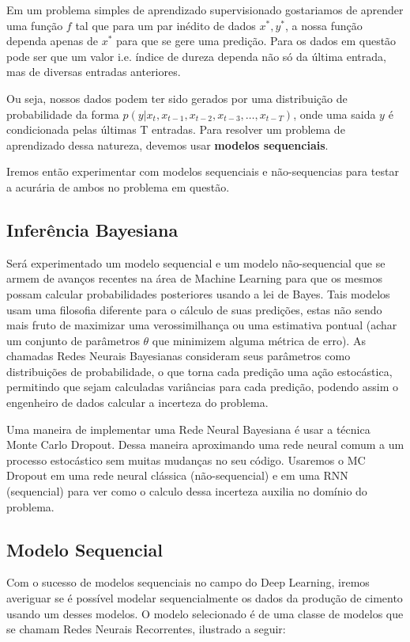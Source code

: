 \documentclass[a4paper]{article}
\begin{document}
Em um problema simples de aprendizado supervisionado gostariamos de aprender uma função $f$ tal que para um par inédito de dados $x^*,y^*$, a nossa função dependa apenas de $x^*$ para que se gere uma predição. Para os dados em questão pode ser que um valor i.e. índice de dureza dependa não só da última entrada, mas de diversas entradas anteriores. 

Ou seja, nossos dados podem ter sido gerados por uma distribuição de probabilidade da forma $p(y | x_{t} ,x_{t -1},x_{t -2},x_{t-3} , \dots, x_{t-T})$, onde uma saida $y$ é condicionada pelas últimas T entradas. Para resolver um problema de aprendizado dessa natureza, devemos usar \textbf{modelos sequenciais}. 

Iremos então experimentar com modelos sequenciais e não-sequencias para testar a acurária de ambos no problema em questão.



\subsection{Inferência Bayesiana}

Será experimentado um modelo sequencial e um modelo não-sequencial que se armem de avanços recentes na área de Machine Learning para que os mesmos possam calcular probabilidades posteriores usando a lei de Bayes. Tais modelos usam uma filosofia diferente para o cálculo de suas predições, estas não sendo mais fruto de maximizar uma verossimilhança ou uma estimativa pontual (achar um conjunto de parâmetros $\theta$ que minimizem alguma métrica de erro). As chamadas Redes Neurais Bayesianas consideram seus parâmetros como distribuições de probabilidade, o que torna cada predição uma ação estocástica, permitindo que sejam calculadas variâncias para cada predição, podendo assim o engenheiro de dados calcular a incerteza do problema.

Uma maneira de implementar uma Rede Neural Bayesiana é usar a técnica Monte Carlo Dropout. Dessa maneira aproximando uma rede neural comum a um processo estocástico sem muitas mudanças no seu código. Usaremos o MC Dropout em uma rede neural clássica (não-sequencial) e em uma RNN (sequencial) para ver como o calculo dessa incerteza auxilia no domínio do problema.

\subsection{Modelo Sequencial}
Com o sucesso de modelos sequenciais no campo do Deep Learning, iremos averiguar se é possível modelar sequencialmente os dados da produção de cimento usando um desses modelos. O modelo selecionado é de uma classe de modelos que se chamam Redes Neurais Recorrentes, ilustrado a seguir:
\\
\end{document}
